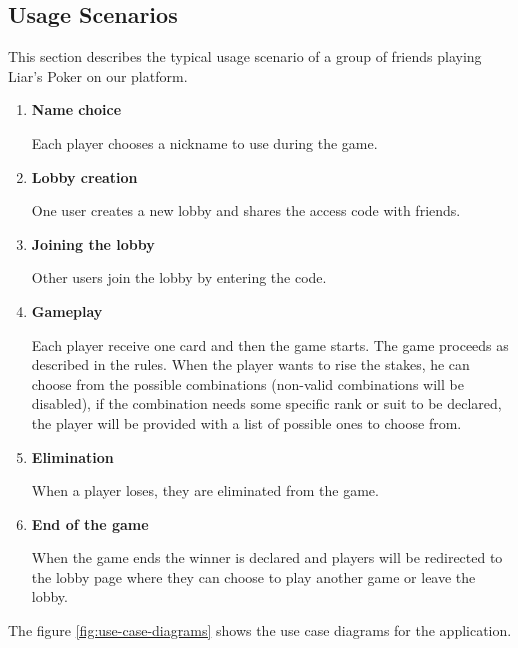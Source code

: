 \documentclass{scrartcl}
\begin{document}
\subsection{Usage Scenarios}\label{usage-scenarios}
This section describes the typical usage scenario of a group of friends playing Liar's Poker on our
platform.
\begin{enumerate}
      \item \textbf{Name choice}\par
            Each player chooses a nickname to use during the game.
      \item \textbf{Lobby creation}\par
            One user creates a new lobby and shares the access code with friends.
      \item \textbf{Joining the lobby}\par
            Other users join the lobby by entering the code.
      \item \textbf{Gameplay}\par
            Each player receive one card and then the game starts. The game proceeds as described in
            the rules. When the player wants to rise the stakes, he can choose from the possible
            combinations (non-valid combinations will be disabled), if the combination needs some
            specific rank or suit to be declared, the player will be provided with a list of possible
            ones to choose from.
      \item \textbf{Elimination}\par
            When a player loses, they are eliminated from the game.
      \item \textbf{End of the game}\par
            When the game ends the winner is declared and players will be redirected to the lobby page
            where they can choose to play another game or leave the lobby.
\end{enumerate}

The figure \ref{fig:use-case-diagrams} shows the use case diagrams for the application.
\end{document}
